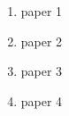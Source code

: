 
\listofpublications

\begin{enumerate}
	
	\item paper 1
	\item paper 2
	\item paper 3
	\item paper 4
	
\end{enumerate}